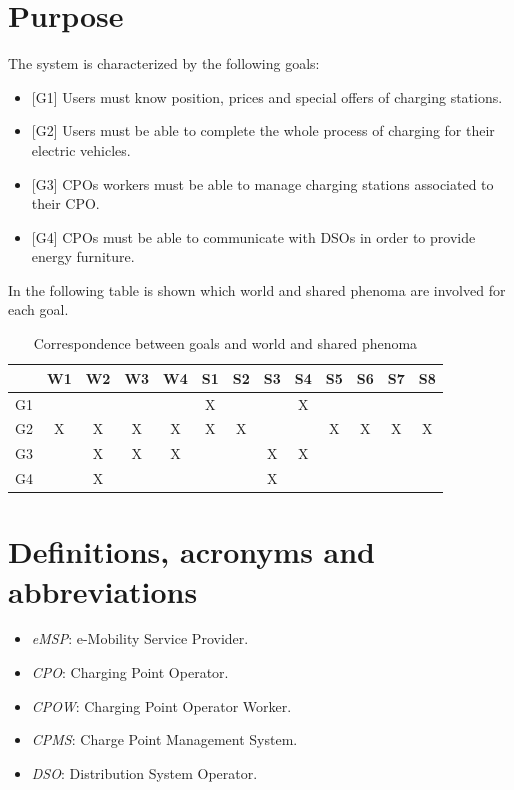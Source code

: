 \documentclass[a4paper]{report}
\begin{document}
\section{Purpose}
The system is characterized by the following goals:
\begin{itemize}
\item{[G1]} \label{G1}Users must know position, prices and special offers of charging stations.
\item {[G2]} \label{G2}Users must be able to complete the whole process of charging for their electric vehicles.	
\item  {[G3]} \label{G3}CPOs workers must be able to manage charging stations associated to their CPO.
\item  {[G4]} \label{G4}CPOs must be able to communicate with DSOs in order to provide energy furniture.
\end{itemize}

In the following table is shown which world and shared phenoma are involved for each goal.
\begin{table}[H]  
  \centering
  \begin{tabular}{|c|c|c|c|c|c|c|c|c|c|c|c|c|}
    \cline{2-13}
    \multicolumn{1}{c|}{} & W1 & W2 & W3 & W4 & S1 & S2 & S3 & S4 & S5 & S6 & S7 & S8\\ \hline
    G1 &   &   &   &   & X &   &   & X &   &   &   &   \\ \hline
    G2 & X & X & X & X & X & X &   &   & X & X & X & X \\ \hline
    G3 &   & X & X & X &   &   & X & X &   &   &   &   \\ \hline
    G4 &   & X &   &   &   &   & X &   &   &   &   &   \\ \hline
  \end{tabular}
  \caption{Correspondence between goals and world and shared phenoma}
\end{table}


\section{Definitions, acronyms and abbreviations}
\begin{itemize}
\item \textit{eMSP}: e-Mobility Service Provider.
\item \textit{CPO}: Charging Point Operator.
\item \textit{CPOW}: Charging Point Operator Worker.
\item \textit{CPMS}: Charge Point Management System.
\item \textit{DSO}: Distribution System Operator.
\end{itemize}
\end{document}
